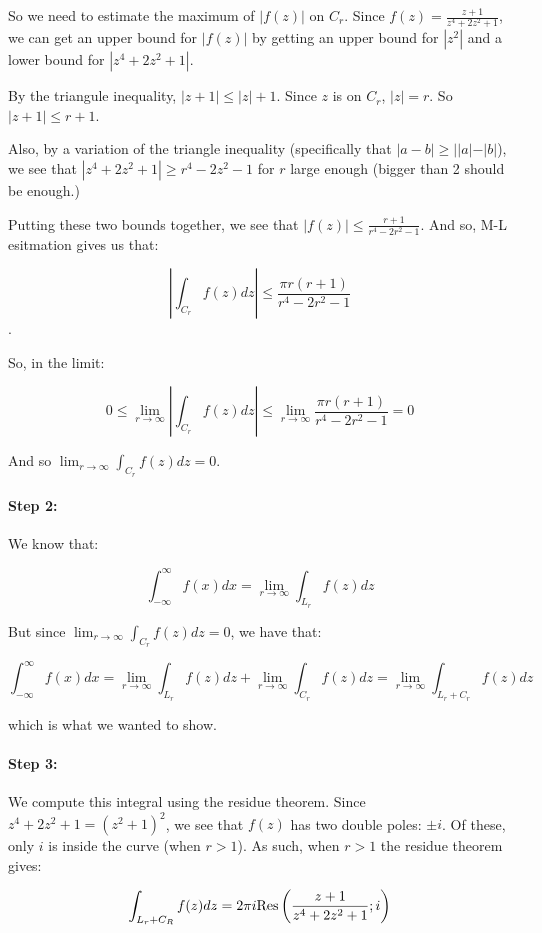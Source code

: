 \begin{ex}{}{}
So we need to estimate the maximum of $|f(z)|$ on $C_r$. Since $f(z) = \frac{z+1}{z^4 + 2z^2 + 1}$, we can get an upper bound for $|f(z)|$ by getting an upper bound for $|z^2|$ and a lower bound for $|z^4 + 2z^2 + 1|$.

By the triangule inequality, $|z+1| \le |z| + 1$. Since $z$ is on $C_r$, $|z| = r$. So $|z+1| \le r+1$.

Also, by a variation of the triangle inequality (specifically that $|a-b| \ge ||a|-|b|$), we see that $|z^4+2z^2+1| \ge r^4 - 2z^2 - 1$ for $r$ large enough (bigger than 2 should be enough.)

Putting these two bounds together, we see that $|f(z)| \le \frac{r+1}{r^4 - 2r^2 - 1}$. And so, M-L esitmation gives us that:

$$\left| \int_{C_r} f(z)dz \right| \le \frac{\pi r(r+1)}{r^4 - 2r^2 -1}$$.

So, in the limit:

$$0 \le \lim_{r\rightarrow \infty} \left| \int_{C_r} f(z)dz \right| \le \lim_{r\rightarrow \infty}\frac{\pi r(r+1)}{r^4 - 2r^2 -1} = 0$$

And so $\lim_{r\rightarrow \infty} \int_{C_r} f(z)dz = 0$.

\paragraph{Step 2:} We know that:

$$\int_{-\infty}^\infty f(x)dx = \lim_{r\rightarrow \infty} \int_{L_r}f(z)dz$$

But since $ \lim_{r\rightarrow \infty} \int_{C_r}f(z)dz = 0$, we have that:

$$\int_{-\infty}^\infty f(x)dx = \lim_{r\rightarrow \infty} \int_{L_r}f(z)dz + \lim_{r\rightarrow \infty} \int_{C_r}f(z)dz =\lim_{r\rightarrow \infty} \int_{L_r+C_r}f(z)dz$$

\noin which is what we wanted to show.

\paragraph{Step 3:} We compute this integral using the residue theorem. Since $z^4+2z^2 + 1 = (z^2+1)^2$, we see that $f(z)$ has two double poles: $\pm i$. Of these, only $i$ is inside the curve (when $r > 1$). As such, when $r > 1$ the residue theorem gives:

$$\int_{L_r + C_R} f(z)dz = 2\pi i \mathrm{Res}\left(\frac{z+1}{z^4+2z^2 +1}; i\right)$$


\end{ex}
